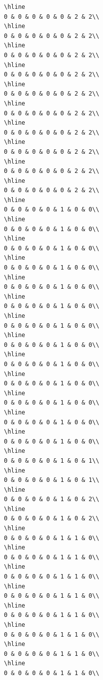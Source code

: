 \documentclass[
]{article}
\begin{document}
\begin{verbatim}
\hline
0 & 0 & 0 & 0 & 0 & 2 & 2\\
\hline
0 & 0 & 0 & 0 & 0 & 2 & 2\\
\hline
0 & 0 & 0 & 0 & 0 & 2 & 2\\
\hline
0 & 0 & 0 & 0 & 0 & 2 & 2\\
\hline
0 & 0 & 0 & 0 & 0 & 2 & 2\\
\hline
0 & 0 & 0 & 0 & 0 & 2 & 2\\
\hline
0 & 0 & 0 & 0 & 0 & 2 & 2\\
\hline
0 & 0 & 0 & 0 & 0 & 2 & 2\\
\hline
0 & 0 & 0 & 0 & 0 & 2 & 2\\
\hline
0 & 0 & 0 & 0 & 0 & 2 & 2\\
\hline
0 & 0 & 0 & 0 & 1 & 0 & 0\\
\hline
0 & 0 & 0 & 0 & 1 & 0 & 0\\
\hline
0 & 0 & 0 & 0 & 1 & 0 & 0\\
\hline
0 & 0 & 0 & 0 & 1 & 0 & 0\\
\hline
0 & 0 & 0 & 0 & 1 & 0 & 0\\
\hline
0 & 0 & 0 & 0 & 1 & 0 & 0\\
\hline
0 & 0 & 0 & 0 & 1 & 0 & 0\\
\hline
0 & 0 & 0 & 0 & 1 & 0 & 0\\
\hline
0 & 0 & 0 & 0 & 1 & 0 & 0\\
\hline
0 & 0 & 0 & 0 & 1 & 0 & 0\\
\hline
0 & 0 & 0 & 0 & 1 & 0 & 0\\
\hline
0 & 0 & 0 & 0 & 1 & 0 & 0\\
\hline
0 & 0 & 0 & 0 & 1 & 0 & 0\\
\hline
0 & 0 & 0 & 0 & 1 & 0 & 1\\
\hline
0 & 0 & 0 & 0 & 1 & 0 & 1\\
\hline
0 & 0 & 0 & 0 & 1 & 0 & 2\\
\hline
0 & 0 & 0 & 0 & 1 & 0 & 2\\
\hline
0 & 0 & 0 & 0 & 1 & 1 & 0\\
\hline
0 & 0 & 0 & 0 & 1 & 1 & 0\\
\hline
0 & 0 & 0 & 0 & 1 & 1 & 0\\
\hline
0 & 0 & 0 & 0 & 1 & 1 & 0\\
\hline
0 & 0 & 0 & 0 & 1 & 1 & 0\\
\hline
0 & 0 & 0 & 0 & 1 & 1 & 0\\
\hline
0 & 0 & 0 & 0 & 1 & 1 & 0\\
\hline
0 & 0 & 0 & 0 & 1 & 1 & 0\\

\end{verbatim}
\end{document}
